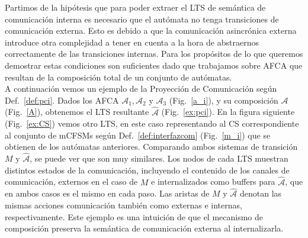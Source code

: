 Partimos de la hipótesis que para poder extraer el LTS de semántica de comunicación interna es necesario que el autómata no tenga transiciones de comunicación externa. Esto es debido a que la comunicación asincrónica externa introduce otra complejidad a tener en cuenta a la hora de abstraernos correctamente de las transiciones internas. Para los propósitos de lo que queremos demostrar estas condiciones son suficientes dado que trabajamos sobre AFCA que resultan de la composición total de un conjunto de autómatas.\\

A continuación vemos un ejemplo de la Proyección de Comunicación según Def.~\ref{def:pci}. Dados los AFCA $\mathcal{A}_1, \mathcal{A}_2$ y $\mathcal{A}_3$ (Fig.~\ref{a_i}), y su composición $\mathcal{A}$ (Fig.~\ref{A}), obtenemos el LTS resultante $\hat{\mathcal{A}}$ (Fig.~\ref{ex:pci}). En la figura siguiente (Fig.~\ref{ex:CS}) vemos otro LTS, en este caso representando al CS correspondiente al conjunto de mCFSMs según Def.~\ref{def:interfazcom} (Fig.~\ref{m_i}) que se obtienen de los autómatas anteriores. Comparando ambos sistemas de transición $M$ y $\hat{\mathcal{A}}$, se puede ver que son muy similares. Los nodos de cada LTS muestran distintos estados de la comunicación, incluyendo el contenido de los canales de comunicación, externos en el caso de $M$ e internalizados como buffers para $\hat{\mathcal{A}}$, que en ambos casos es el mismo en cada paso. Las aristas de $M$ y $\hat{\mathcal{A}}$ denotan las mismas acciones comunicación también como externas e internas, respectivamente. Este ejemplo es una intuición de que el mecanismo de composición preserva la semántica de comunicación externa al internalizarla.

